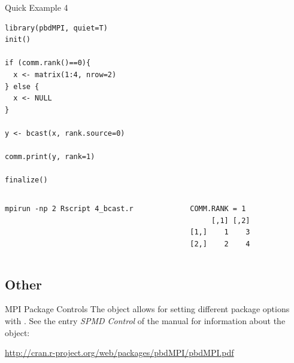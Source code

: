 \begin{frame}
  \begin{exampleblock}{Quick Example 4}
\begin{lstlisting}[title=Broadcast: 4\_bcast.r]
library(pbdMPI, quiet=T)
init()

if (comm.rank()==0){
  x <- matrix(1:4, nrow=2)
} else {
  x <- NULL
}

y <- bcast(x, rank.source=0)

comm.print(y, rank=1)

finalize()
\end{lstlisting}
  \begin{columns}[t,onlytextwidth]
    \begin{column}{0.58\textwidth}
\begin{lstlisting}[backgroundcolor=\color{white},keywordstyle=\color{black},title=Execute this script via:]
mpirun -np 2 Rscript 4_bcast.r
\end{lstlisting}
\end{column}
    \hfill
    \begin{column}{0.4\textwidth}
\begin{lstlisting}[title=Sample Output:]
COMM.RANK = 1
     [,1] [,2]
[1,]    1    3
[2,]    2    4
\end{lstlisting}
    \end{column}
​  \end{columns}
  \end{exampleblock}
\end{frame}







\subsection{Other }


\begin{frame}
  \begin{block}{MPI Package Controls}
The  object allows for setting different package options with .  See the entry \emph{SPMD Control} of the  manual for information about the  object:
\begin{center}
{ \small
\url{http://cran.r-project.org/web/packages/pbdMPI/pbdMPI.pdf}
}
\end{center}
  \end{block}
\end{frame}

